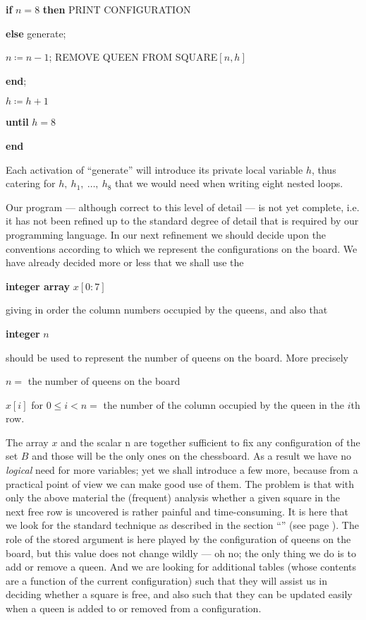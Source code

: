 \quad \quad \textbf{if} $n = 8$ \textbf{then} PRINT CONFIGURATION

\quad \quad \textbf{else} generate;

\quad \quad $n \coloneq n - 1$; REMOVE QUEEN FROM SQUARE$[n,h]$

\quad \textbf{end};

\quad $h \coloneq h + 1$

\quad \textbf{until} $h = 8$

\textbf{end}

Each activation of ``generate'' will introduce its private local variable $h$, thus catering for $h,\ h_1,\ \dots,\ h_8$ that we would need when writing eight nested loops.

Our program --- although correct to this level of detail --- is not yet complete, i.e. it has not been refined up to the standard degree of detail that is required by our programming language. In our next refinement we should decide upon the conventions according to which we represent the configurations on the board. We have already decided more or less that we shall use the

\quad \textbf{integer array} $x[0:7]$

\noindent
giving in order the column numbers occupied by the queens, and also that

\quad \textbf{integer} $n$

\noindent
should be used to represent the number of queens on the board. More precisely

$n =$ the number of queens on the board

\parindent $x[i]$ for $0 \leqslant i < n =$ the number of the column occupied by the queen in the $i$th row.

The array $x$ and the scalar n are together sufficient to fix any configuration of the set $B$ and those will be the only ones on the chessboard. As a result we have no \textit{logical} need for more variables; yet we shall introduce a few more, because from a practical point of view we can make good use of them. The problem is that with only the above material the (frequent) analysis whether a given square in the next free row is uncovered is rather painful and time-consuming. It is here that we look for the standard technique as described in the section ``'' (see page \pageref{sec:trading-storage-for-computation-speed}). The role of the stored argument is here played by the configuration of queens on the board, but this value does not change wildly --- oh no; the only thing we do is to add or remove a queen. And we are looking for additional tables (whose contents are a function of the current configuration) such that they will assist us in deciding whether a square is free, and also such that they can be updated easily when a queen is added to or removed from a configuration.

